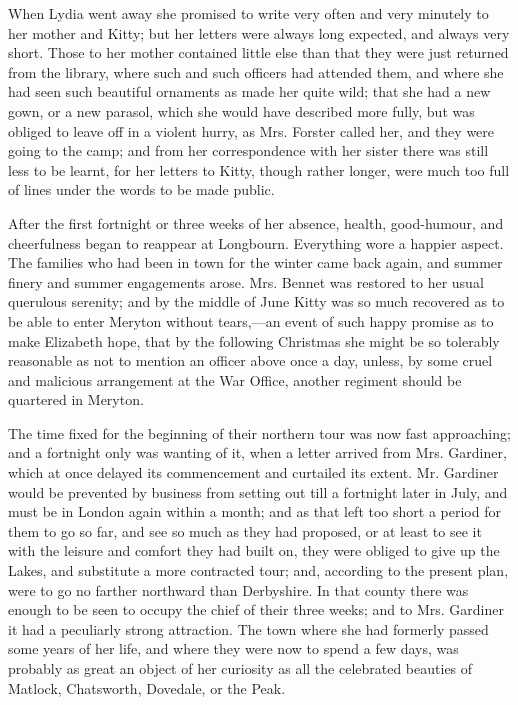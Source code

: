 \documentclass[12pt,openright]{book}
\begin{document}
When Lydia went away she promised to write very often and very minutely to her mother and Kitty; but her letters were always long expected, and always very short. Those to her mother contained little else than that they were just returned from the library, where such and such officers had attended them, and where she had seen such beautiful ornaments as made her quite wild; that she had a new gown, or a new parasol, which she would have described more fully, but was obliged to leave off in a violent hurry, as Mrs. Forster called her, and they were going to the camp; and from her correspondence with her sister there was still less to be learnt, for her letters to Kitty, though rather longer, were much too full of lines under the words to be made public.

After the first fortnight or three weeks of her absence, health, good-humour, and cheerfulness began to reappear at Longbourn. Everything wore a happier aspect. The families who had been in town for the winter came back again, and summer finery and summer engagements arose. Mrs. Bennet was restored to her usual querulous serenity; and by the middle of June Kitty was so much recovered as to be able to enter Meryton without tears,—an event of such happy promise as to make Elizabeth hope, that by the following Christmas she might be so tolerably reasonable as not to mention an officer above once a day, unless, by some cruel and malicious arrangement at the War Office, another regiment should be quartered in Meryton.

The time fixed for the beginning of their northern tour was now fast approaching; and a fortnight only was wanting of it, when a letter arrived from Mrs. Gardiner, which at once delayed its commencement and curtailed its extent. Mr. Gardiner would be prevented by business from setting out till a fortnight later in July, and must be in London again within a month; and as that left too short a period for them to go so far, and see so much as they had proposed, or at least to see it with the leisure and comfort they had built on, they were obliged to give up the Lakes, and substitute a more contracted tour; and, according to the present plan, were to go no farther northward than Derbyshire. In that county there was enough to be seen to occupy the chief of their three weeks; and to Mrs. Gardiner it had a peculiarly strong attraction. The town where she had formerly passed some years of her life, and where they were now to spend a few days, was probably as great an object of her curiosity as all the celebrated beauties of Matlock, Chatsworth, Dovedale, or the Peak.
\end{document}
